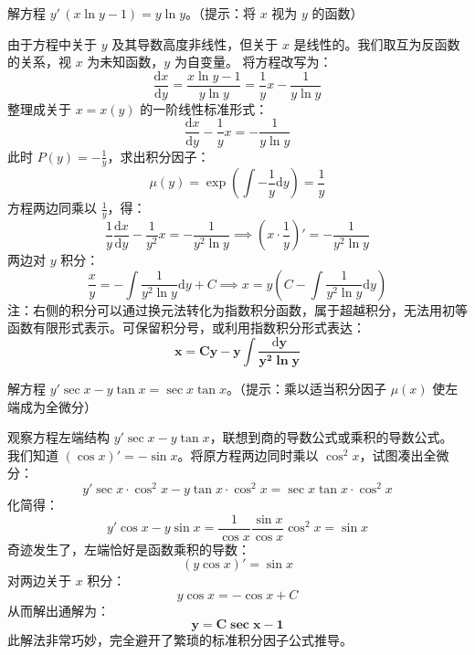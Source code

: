 \documentclass[lang=cn,11pt]{elegantbook}
\begin{document}
\begin{exercise}[提高：角色互换]
解方程 $y'\,(x\ln y-1)=y\ln y$。（提示：将 $x$ 视为 $y$ 的函数）
\end{exercise}
\begin{solution}
 由于方程中关于 $y$ 及其导数高度非线性，但关于 $x$ 是线性的。我们取互为反函数的关系，视 $x$ 为未知函数，$y$ 为自变量。
将方程改写为：
\[
\frac{\mathrm{d}x}{\mathrm{d}y} = \frac{x\ln y - 1}{y\ln y} = \frac{1}{y}x - \frac{1}{y\ln y}
\]
整理成关于 $x=x(y)$ 的一阶线性标准形式：
\[
\frac{\mathrm{d}x}{\mathrm{d}y} - \frac{1}{y}x = -\frac{1}{y\ln y}
\]
此时 $P(y) = -\frac{1}{y}$，求出积分因子：
\[
\mu(y) = \exp\!\left(\int -\frac{1}{y}\mathrm{d}y\right) = \frac{1}{y}
\]
方程两边同乘以 $\frac{1}{y}$，得：
\[
\frac{1}{y}\frac{\mathrm{d}x}{\mathrm{d}y} - \frac{1}{y^2}x = -\frac{1}{y^2\ln y} \implies \left(x\cdot \frac{1}{y}\right)' = -\frac{1}{y^2\ln y}
\]
两边对 $y$ 积分：
\[
\frac{x}{y} = -\int \frac{1}{y^2\ln y}\mathrm{d}y + C \implies x = y\left( C - \int \frac{1}{y^2\ln y}\mathrm{d}y \right)
\]
注：右侧的积分可以通过换元法转化为指数积分函数，属于超越积分，无法用初等函数有限形式表示。可保留积分号，或利用指数积分形式表达：
\[
\mathbf{x = Cy - y \int \frac{\mathrm{d}y}{y^2\ln y}}
\]
\end{solution}

\begin{exercise}[提高：三角代换]
解方程 $y'\sec x-y\tan x=\sec x\tan x$。（提示：乘以适当积分因子 $\mu(x)$ 使左端成为全微分）
\end{exercise}
\begin{solution}
观察方程左端结构 $y'\sec x - y\tan x$，联想到商的导数公式或乘积的导数公式。
我们知道 $(\cos x)' = -\sin x$。将原方程两边同时乘以 $\cos^2 x$，试图凑出全微分：
\[
y'\sec x\cdot\cos^2 x - y\tan x\cdot\cos^2 x = \sec x\tan x\cdot\cos^2 x
\]
化简得：
\[
y'\cos x - y\sin x = \frac{1}{\cos x}\frac{\sin x}{\cos x}\cos^2 x = \sin x
\]
奇迹发生了，左端恰好是函数乘积的导数：
\[
(y\cos x)' = \sin x
\]
对两边关于 $x$ 积分：
\[
y\cos x = -\cos x + C
\]
从而解出通解为：
\[
\mathbf{y = C\sec x - 1}
\]
此解法非常巧妙，完全避开了繁琐的标准积分因子公式推导。
\end{solution}
\end{document}
